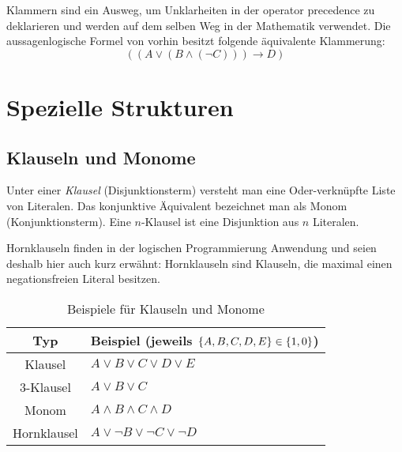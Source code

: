 Klammern sind ein Ausweg, um Unklarheiten in der operator precedence zu deklarieren und werden auf dem selben Weg in der Mathematik verwendet.
Die aussagenlogische Formel von vorhin besitzt folgende äquivalente Klammerung:
%
\begin{equation}
  ((A \lor (B \land (\neg C))) \rightarrow D)
\end{equation}
%
\section{Spezielle Strukturen}
%
\subsection{Klauseln und Monome}
%
Unter einer \emph{Klausel} (Disjunktionsterm) versteht man eine Oder-verknüpfte Liste von Literalen. Das konjunktive Äquivalent bezeichnet man als Monom (Konjunktionsterm). Eine $n$-Klausel ist eine Disjunktion aus $n$ Literalen.

Hornklauseln finden in der logischen Programmierung Anwendung und seien deshalb hier auch kurz erwähnt: Hornklauseln sind Klauseln, die maximal einen negationsfreien Literal besitzen.
%
\begin{table}[ht]
 \begin{center}
  \begin{tabular}{cl}
   \hline
    Typ         & Beispiel (jeweils $\left\{A, B, C, D, E\right\} \in \left\{1, 0\right\}$) \\
   \hline \hline
    Klausel     & $A \lor B \lor C \lor D \lor E$ \\
    3-Klausel   & $A \lor B \lor C$ \\
    Monom       & $A \land B \land C \land D$ \\
    Hornklausel & $A \lor \neg B \lor \neg C \lor \neg D$ \\
   \hline
  \end{tabular}
  \caption{Beispiele für Klauseln und Monome}
  \label{fig:clauses_monoms}
 \end{center}
\end{table}
%
